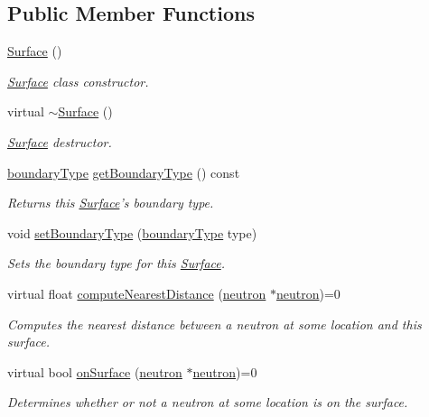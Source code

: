 \subsection*{Public Member Functions}
\begin{DoxyCompactItemize}
\item 
\hyperlink{classSurface_a8fc57f2a15292135c00545c9d224ec68}{Surface} ()
\begin{DoxyCompactList}\small\item\em \hyperlink{classSurface}{Surface} class constructor. \end{DoxyCompactList}\item 
\hypertarget{classSurface_a89de75c95cb550d432f3ea4ed1429db0}{virtual \hyperlink{classSurface_a89de75c95cb550d432f3ea4ed1429db0}{$\sim$\-Surface} ()}\label{classSurface_a89de75c95cb550d432f3ea4ed1429db0}

\begin{DoxyCompactList}\small\item\em \hyperlink{classSurface}{Surface} destructor. \end{DoxyCompactList}\item 
\hyperlink{Surface_8h_a94f2bdaf8e1769faec72dbd9e7486341}{boundary\-Type} \hyperlink{classSurface_a33b25b8e797853cf582cf5085262e028}{get\-Boundary\-Type} () const 
\begin{DoxyCompactList}\small\item\em Returns this \hyperlink{classSurface}{Surface}'s boundary type. \end{DoxyCompactList}\item 
void \hyperlink{classSurface_a3bce151806619035116fa8cbb68ae62b}{set\-Boundary\-Type} (\hyperlink{Surface_8h_a94f2bdaf8e1769faec72dbd9e7486341}{boundary\-Type} type)
\begin{DoxyCompactList}\small\item\em Sets the boundary type for this \hyperlink{classSurface}{Surface}. \end{DoxyCompactList}\item 
virtual float \hyperlink{classSurface_a3d33dd138200489112a2369eab0b2083}{compute\-Nearest\-Distance} (\hyperlink{structneutron}{neutron} $\ast$\hyperlink{structneutron}{neutron})=0
\begin{DoxyCompactList}\small\item\em Computes the nearest distance between a neutron at some location and this surface. \end{DoxyCompactList}\item 
virtual bool \hyperlink{classSurface_acdf69fa01f522393ab504b331d88821a}{on\-Surface} (\hyperlink{structneutron}{neutron} $\ast$\hyperlink{structneutron}{neutron})=0
\begin{DoxyCompactList}\small\item\em Determines whether or not a neutron at some location is on the surface. \end{DoxyCompactList}\end{DoxyCompactItemize}
